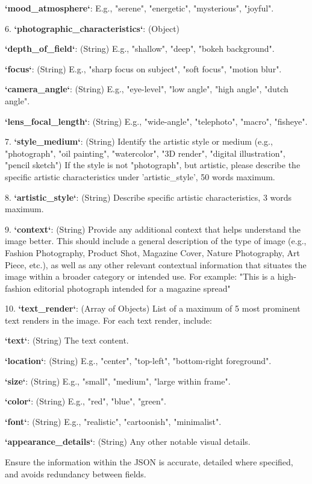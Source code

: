 \begin{table}[t]
\begin{tcolorbox}
\quad    * \textbf{`mood\_atmosphere`}: E.g., "serene", "energetic", "mysterious", "joyful".

6. \textbf{`photographic\_characteristics`}: (Object)

\quad    * \textbf{`depth\_of\_field`}: (String) E.g., "shallow", "deep", "bokeh background".

\quad    * \textbf{`focus`}: (String) E.g., "sharp focus on subject", "soft focus", "motion blur".

\quad    * \textbf{`camera\_angle`}: (String) E.g., "eye-level", "low angle", "high angle", "dutch angle".

\quad    * \textbf{`lens\_focal\_length`}: (String) E.g., "wide-angle", "telephoto", "macro", "fisheye".

7. \textbf{`style\_medium`}: (String) Identify the artistic style or medium (e.g., "photograph", "oil painting", "watercolor", "3D render", "digital illustration", "pencil sketch") If the style is not "photograph", but artistic, please describe the specific artistic characteristics under 'artistic\_style', 50 words maximum.

8. \textbf{`artistic\_style`}: (String) Describe specific artistic characteristics, 3 words maximum.

9. \textbf{`context`}: (String) Provide any additional context that helps understand the image better. This should include a general description of the type of image (e.g., Fashion Photography, Product Shot, Magazine Cover, Nature Photography, Art Piece, etc.), as well as any other relevant contextual information that situates the image within a broader category or intended use. For example: "This is a high-fashion editorial photograph intended for a magazine spread"

10. \textbf{`text\_render`}: (Array of Objects) List of a maximum of 5 most prominent text renders in the image. For each text render, include:

\quad    * \textbf{`text`}: (String) The text content.
    
\quad    * \textbf{`location`}: (String) E.g., "center", "top-left", "bottom-right foreground".
    
\quad    * \textbf{`size`}: (String) E.g., "small", "medium", "large within frame".
    
\quad    * \textbf{`color`}: (String) E.g., "red", "blue", "green".
    
\quad    * \textbf{`font`}: (String) E.g., "realistic", "cartoonish", "minimalist".
    
\quad    * \textbf{`appearance\_details`}: (String) Any other notable visual details.

Ensure the information within the JSON is accurate, detailed where specified, and avoids redundancy between fields.
\end{tcolorbox}
\caption{System prompt used to generate structured captions.}
\label{tab:system_prompt}
\end{table}

